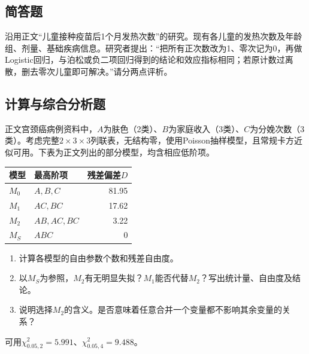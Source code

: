 \par\addvspace{8pt}\noindent\begin{minipage}{\linewidth}

\subsection{简答题}


沿用正文“儿童接种疫苗后1个月发热次数”的研究。现有各儿童的发热次数及年龄组、剂量、基础疾病信息。研究者提出：“把所有正次数改为1、零次记为0，再做Logistic回归，与泊松或负二项回归得到的结论和效应指标相同；若原计数过离散，删去零次儿童即可解决。”请分两点评析。


\end{minipage}\par\vspace{5pt}

\par\addvspace{8pt}\noindent\begin{minipage}{\linewidth}

\subsection{计算与综合分析题}


正文宫颈癌病例资料中，\(A\)为肤色（2类）、\(B\)为家庭收入（3类）、\(C\)为分娩次数（3类）。考虑完整\(2\times3\times3\)列联表，无结构零，使用Poisson抽样模型，且常规卡方近似可用。下表为正文列出的部分模型，均含相应低阶项。
\begin{center}\begin{tabular}{llr}\toprule
模型 & 最高阶项 & 残差偏差\(D\)\\\midrule
\(M_0\) & \(A,B,C\) & 81.95\\
\(M_1\) & \(AC,BC\) & 17.62\\
\(M_2\) & \(AB,AC,BC\) & 3.22\\
\(M_S\) & \(ABC\) & 0\\\bottomrule
\end{tabular}\end{center}
\begin{enumerate}
\item 计算各模型的自由参数个数和残差自由度。
\item 以\(M_S\)为参照，\(M_2\)有无明显失拟？\(M_1\)能否代替\(M_2\)？写出统计量、自由度及结论。
\item 说明选择\(M_2\)的含义。是否意味着任意合并一个变量都不影响其余变量的关系？
\end{enumerate}
可用\(\chi^2_{0.05,2}=5.991\)、\(\chi^2_{0.05,4}=9.488\)。


\end{minipage}\par\vspace{5pt}

